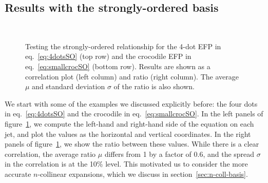 \documentclass[a4paper,11pt]{article}
\newcommand{\eq}[1]{eq.~\eqref{eq:#1}}
\renewcommand{\sec}[1]{section~\ref{sec:#1}}
\newcommand{\fig}[1]{figure~\ref{fig:#1}}
\begin{document}
\subsection{Results with the strongly-ordered basis}
\label{sec:SO-basis}


\begin{figure}[p]
  \hfill 
  \\ 
    \hfill 
      \caption{
      Testing the strongly-ordered relationship for the 4-dot EFP in \eq{4dotsSO} (top row) and the crocodile EFP in \eq{smallcrocSO} (bottom row).
      Results are shown as a correlation plot (left column) and ratio (right column).
      The average $\mu$ and standard deviation $\sigma$ of the ratio is also shown.}
       \label{fig:LL_corr}
\end{figure} 


We start with some of the examples we discussed explicitly before: the four dots in \eq{4dotsSO} and the crocodile in \eq{smallcrocSO}.
%
In the left panels of \fig{LL_corr}, we compute the left-hand and right-hand side of the equation on each jet, and plot the values as the horizontal and vertical coordinates.
%
In the right panels of \fig{LL_corr}, we show the ratio between these values.
%
While there is a clear correlation, the average ratio $\mu$ differs from 1 by a factor of 0.6, and the spread $\sigma$ in the correlation is at the 10\% level.
%
This motivated us to consider the more accurate $n$-collinear expansions, which we discuss in \sec{n-coll-basis}.
\end{document}
